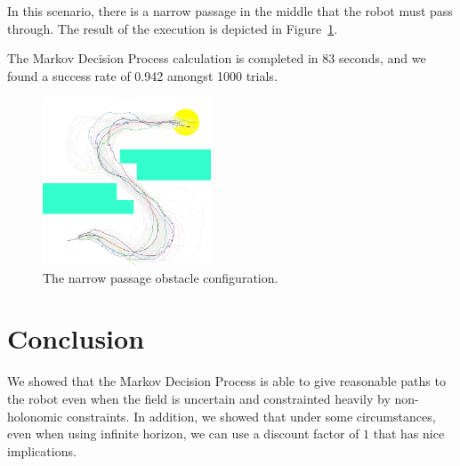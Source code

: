 \documentclass[a4paper]{article}
\begin{document}
In this scenario, there is a narrow passage in the middle that the robot
must pass through.
The result of the execution is depicted in Figure~\ref{f:narrow}.

The Markov Decision Process calculation is completed in 83 seconds,
and we found a success rate of 0.942 amongst 1000 trials.

\begin{figure}
\caption{The narrow passage obstacle configuration.}
\label{f:narrow}
\centerline{\includegraphics[width=5cm]{narrow.png}}
\end{figure}

\section{Conclusion}
We showed that the Markov Decision Process is able to give reasonable paths
to the robot even when the field is uncertain and constrainted heavily by
non-holonomic constraints. In addition, we showed that under some circumstances,
even when using infinite horizon, we can use a discount factor of $1$ that has
nice implications.
\end{document}
